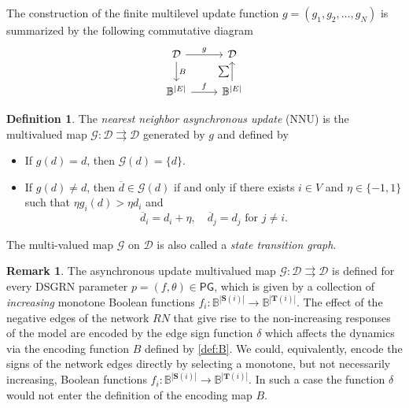 \documentclass[12pt, notitlepage]{amsart}
\newcommand{\cD}{\mathcal{D}}
\newcommand{\cG}{{\mathcal G}}
\theoremstyle{definition}
\newtheorem{defn}[thm]{Definition}
\newtheorem{rem}[thm]{Remark}
\newcommand{\Targets}{\mathbf{T}}
\newcommand{\Sources}{\mathbf{S}}
\newcommand{\PG}{\mathsf{PG}}
\newcommand{\ol}[1]{\overline{#1}}
\newcommand{\bbB}{\mathbb{B}}
\begin{document}
  The construction of the finite multilevel update function $g = (g_1, g_2,\ldots, g_N)$ is summarized by the following commutative diagram
  \begin{equation}
    \label{comm:diag}
    \begin{tikzcd}
      \cD \arrow[r, "g"] \arrow[d,"B"] & \cD \\
      \bbB^{|E|}  \arrow[r, "f" ] & \bbB^{|E|} \arrow[u, "\sum"]
    \end{tikzcd}
  \end{equation}

  \begin{defn}
    \label{def:update}
    The \textit{nearest neighbor asynchronous update} (NNU) is the multivalued map $\cG \colon \cD \rightrightarrows \cD$ generated by $g$ and defined by
    \begin{itemize}
      \item If $g(d) = d$, then $\cG(d) = \{ d \}$.
      \item If $g(d) \neq d$, then $\ol{d} \in \cG(d)$ if and only if there exists $i \in V$ and $\eta \in \{-1, 1\}$ such that $\eta g_i(d) > \eta d_i$ and
        \[
          \ol{d}_i = d_i + \eta, \quad \ol{d}_j = d_j \mbox{ for } j\neq i.
        \]
    \end{itemize}
    The multi-valued map $\cG$ on $\mathcal D$ is also called a \textit{state transition graph}.
  \end{defn}

  \begin{rem}
    \label{rem:increasing_MBFs}
    The asynchronous update multivalued map $\cG \colon \cD \rightrightarrows \cD$ is defined for every DSGRN parameter $p = (f, \theta) \in \PG$, which is given by a collection of \emph{increasing} monotone Boolean functions $f_i \colon \bbB^{|\Sources(i)|} \to \bbB^{|\Targets(i)|}$. The effect of the negative edges of the network $RN$ that give rise to the non-increasing responses of the model are  encoded by the edge sign function $\delta$ which affects the dynamics via the encoding function $B$ defined by \eqref{def:B}. We could, equivalently, encode the signs of the network edges directly by selecting a monotone, but not necessarily increasing, Boolean functions $f_i \colon \bbB^{|\Sources(i)|} \to \bbB^{|\Targets(i)|}$. In such a case the function $\delta$ would not enter the definition of the encoding map $B$.
  \end{rem}

\end{document}
